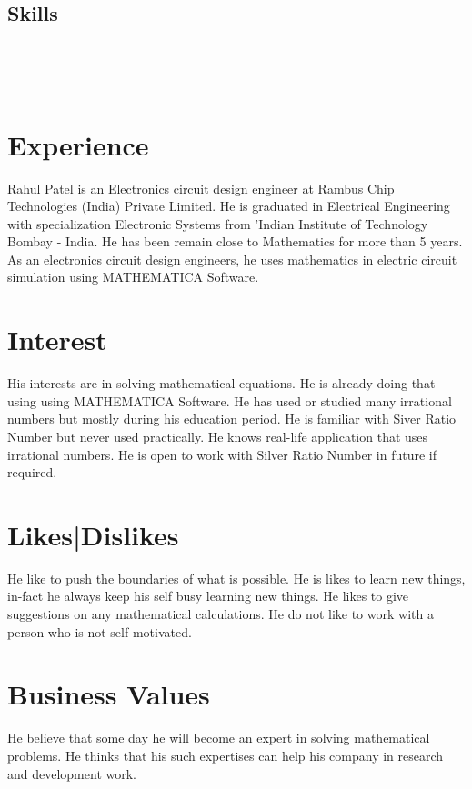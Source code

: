 \documentclass[]{friggeri-cv}
\begin{document}
\begin{aside}
  \section{Skills}
    ~
\end{aside}
~
\section{Experience}
Rahul Patel is an Electronics circuit design engineer at Rambus Chip Technologies (India) Private Limited. He is graduated in Electrical Engineering with specialization Electronic Systems from 'Indian Institute of Technology Bombay - India. He has been remain close to Mathematics for more than 5 years. As an electronics circuit design engineers, he uses mathematics in electric circuit simulation using MATHEMATICA Software. 

\section{Interest}
His interests are in solving mathematical equations. He is already doing that using using MATHEMATICA Software.  He has used or studied many irrational numbers but mostly during his education period. He is familiar with Siver Ratio Number but never used practically. He knows real-life application that uses irrational numbers. He is open to work with Silver Ratio Number in future if required.

\section{Likes|Dislikes}
He like to push the boundaries of what is possible. He is likes to learn new things, in-fact he always keep his self busy learning new things. He likes to give suggestions on any mathematical calculations. He do not like to work with a person who is not self motivated.

\section{Business Values}
He believe that some day he will become an expert in solving mathematical problems. He thinks that his such expertises can help his company in research and development work.
\end{document}
